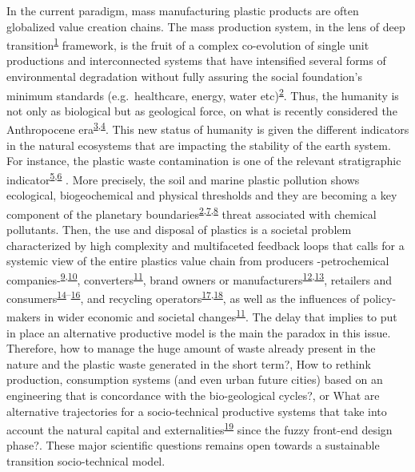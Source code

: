\documentclass[
  12pt,
  a4paperpaper,
  onecolumn]{article}
\begin{document}
In the current paradigm, mass manufacturing plastic products are often
globalized value creation chains. The mass production system, in the
lens of deep
transition\textsuperscript{\protect\hyperlink{ref-kanger2022}{1}}
framework, is the fruit of a complex co-evolution of single unit
productions and interconnected systems that have intensified several
forms of environmental degradation without fully assuring the social
foundation's minimum standards (e.g.~healthcare, energy, water
etc)\textsuperscript{\protect\hyperlink{ref-raworth2017}{2}}. Thus, the
humanity is not only as biological but as geological force, on what is
recently considered the Anthropocene
era\textsuperscript{\protect\hyperlink{ref-steffen2018}{3},\protect\hyperlink{ref-steffen2011}{4}}.
This new status of humanity is given the different indicators in the
natural ecosystems that are impacting the stability of the earth system.
For instance, the plastic waste contamination is one of the relevant
stratigraphic
indicator\textsuperscript{\protect\hyperlink{ref-porta2021}{5},\protect\hyperlink{ref-de-la-torre2021}{6}
}. More precisely, the soil and marine plastic pollution shows
ecological, biogeochemical and physical thresholds and they are becoming
a key component of the planetary
boundaries\textsuperscript{\protect\hyperlink{ref-raworth2017}{2},\protect\hyperlink{ref-ONeill2018}{7},\protect\hyperlink{ref-Rockstrom2009}{8}}
threat associated with chemical pollutants. Then, the use and disposal
of plastics is a societal problem characterized by high complexity and
multifaceted feedback loops that calls for a systemic view of the entire
plastics value chain from producers -petrochemical
companies-\textsuperscript{\protect\hyperlink{ref-Iles2013}{9},\protect\hyperlink{ref-DeVargasMores2018}{10}},
converters\textsuperscript{\protect\hyperlink{ref-Paletta2019}{11}},
brand owners or
manufacturers\textsuperscript{\protect\hyperlink{ref-Gong2020}{12},\protect\hyperlink{ref-Ma2020}{13}},
retailers and
consumers\textsuperscript{\protect\hyperlink{ref-Confente2020}{14}--\protect\hyperlink{ref-Filho2021}{16}},
and recycling
operators\textsuperscript{\protect\hyperlink{ref-Huysveld2019}{17},\protect\hyperlink{ref-Pazienza2020}{18}},
as well as the influences of policy-makers in wider economic and
societal
changes\textsuperscript{\protect\hyperlink{ref-Paletta2019}{11}}. The
delay that implies to put in place an alternative productive model is
the main the paradox in this issue. Therefore, how to manage the huge
amount of waste already present in the nature and the plastic waste
generated in the short term?, How to rethink production, consumption
systems (and even urban future cities) based on an engineering that is
concordance with the bio-geological cycles?, or What are alternative
trajectories for a socio-technical productive systems that take into
account the natural capital and
externalities\textsuperscript{\protect\hyperlink{ref-zhen2021}{19}}
since the fuzzy front-end design phase?. These major scientific
questions remains open towards a sustainable transition socio-technical
model.
\end{document}
